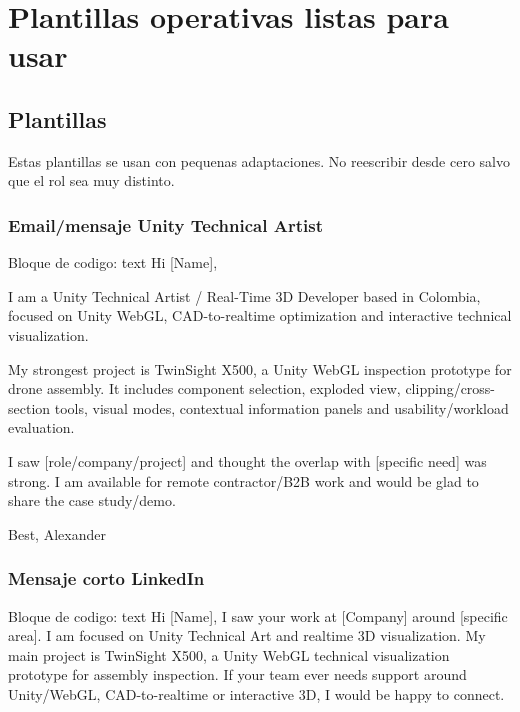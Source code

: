 \chapter{Plantillas operativas listas para usar}

\section{Plantillas}


Estas plantillas se usan con pequenas adaptaciones. No reescribir desde cero salvo que el rol sea muy distinto.


\subsection{Email/mensaje Unity Technical Artist}


\begin{mdcode}
Bloque de codigo: text
Hi [Name],

I am a Unity Technical Artist / Real-Time 3D Developer based in Colombia, focused on Unity WebGL, CAD-to-realtime optimization and interactive technical visualization.

My strongest project is TwinSight X500, a Unity WebGL inspection prototype for drone assembly. It includes component selection, exploded view, clipping/cross-section tools, visual modes, contextual information panels and usability/workload evaluation.

I saw [role/company/project] and thought the overlap with [specific need] was strong. I am available for remote contractor/B2B work and would be glad to share the case study/demo.

Best,
Alexander
\end{mdcode}


\subsection{Mensaje corto LinkedIn}


\begin{mdcode}
Bloque de codigo: text
Hi [Name], I saw your work at [Company] around [specific area]. I am focused on Unity Technical Art and realtime 3D visualization. My main project is TwinSight X500, a Unity WebGL technical visualization prototype for assembly inspection. If your team ever needs support around Unity/WebGL, CAD-to-realtime or interactive 3D, I would be happy to connect.
\end{mdcode}


